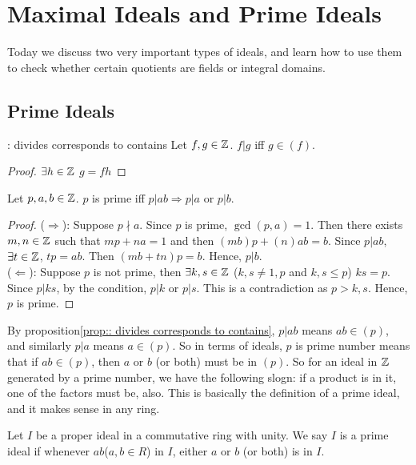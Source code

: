 \chapter{Maximal Ideals and Prime Ideals}\label{chp:4_4}

Today we discuss two very important types of ideals, and learn how to use them to check whether
certain quotients are fields or integral domains.

\section{Prime Ideals}

\begin{proposition}{}{: divides corresponds to contains}
    Let $f,g\in \mathbb{Z}$. $f|g$ iff $g\in (f)$.
\end{proposition}
\begin{proof}
    $\exists h\in \mathbb{Z}$  $g=fh$
\end{proof}

\begin{proposition}{}{}
    Let $p,a,b\in\mathbb{Z}$. 
    $p$ is prime iff $p|ab\Rightarrow p|a$ or $p|b$. 
\end{proposition}
\begin{proof}
    ($\Rightarrow$): Suppose $p\nmid a$. Since $p$ is prime, $\gcd(p,a)=1$. 
    Then there exists $m,n\in \mathbb{Z}$ such that $mp+na=1$ and then $(mb)p+(n)ab=b$.
    Since $p|ab$, $\exists t\in\mathbb{Z}$, $tp=ab$. Then $(mb+tn)p=b$. Hence, $p|b$.\\
    ($\Leftarrow$): Suppose $p$ is not prime, then $\exists k,s\in\mathbb{Z}$ ($k,s\neq 1,p$ and $k,s\leq p$)  $ks=p$.
    Since $p|ks$, by the condition, $p|k$ or $p|s$. This is a contradiction as $p>k,s$.
    Hence, $p$ is prime. 
\end{proof}

By proposition\ref{prop:: divides corresponds to contains}, $p|ab$ means $ab\in (p)$, 
and similarly $p|a$ means $a\in (p)$.
So in terms of ideals, $p$ is prime number means that if $ab\in (p)$, 
then $a$ or $b$ (or both) must be in $(p)$. So for an ideal in $\mathbb{Z}$ generated by a prime number, 
we have the following slogn: if a product is in it, one of the factors must be, also. 
This is basically the definition of a prime ideal, and it makes sense in any ring.

\begin{definition}{}{}
    Let $I$ be a proper ideal in a commutative ring with unity. 
    We say $I$ is a prime ideal if whenever $ab$($a,b\in R$) in $I$,
    either $a$ or $b$ (or both) is in $I$.
\end{definition}

